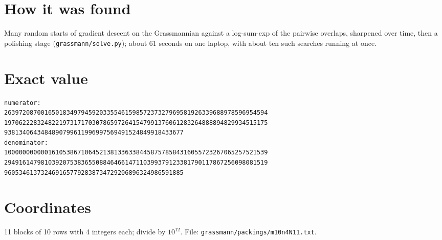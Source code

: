 \documentclass[11pt,a4paper]{article}
\begin{document}
\section{How it was found}
Many random starts of gradient descent on the Grassmannian against a log-sum-exp of the pairwise overlaps, sharpened over time, then a polishing stage (\texttt{grassmann/solve.py}); about 61 seconds on one laptop, with about ten such searches running at once.


\appendix
\section{Exact value}
{\small
\begin{verbatim}
numerator:
263972087001650183497945920335546159857237327969581926339688978596954594
197062228324822197317170307865972641547991376061283264888894829934515175
9381340643484890799611996997569491524849918433677
denominator:
100000000000161053867106452138133633844587578584316055723267065257521539
294916147981039207538365508846466147110399379123381790117867256098081519
9605346137324691657792838734729206896324986591885
\end{verbatim}}

\section{Coordinates}
11 blocks of 10 rows with 4 integers each; divide by $10^{12}$. File: \texttt{grassmann/packings/m10n4N11.txt}.
{\tiny
\begin{multicols}{3}
\end{multicols}}
\end{document}
